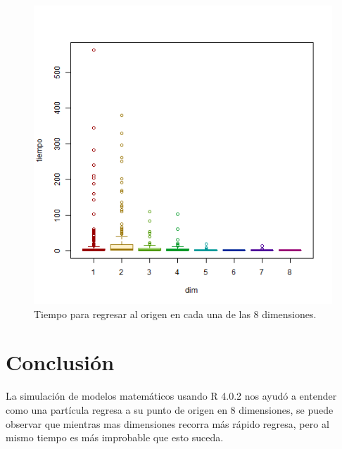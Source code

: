 \documentclass{article}
\begin{document}
\begin{figure}

 \begin{center}
\includegraphics[scale=0.3]{demo.png}
\end{center}
  \caption{Tiempo para regresar al origen en cada una de las 8 dimensiones.}
  \label{f1}
 
\end{figure}
 
\newpage

\section{Conclusi\'on}

La simulaci\'on de modelos matem\'aticos usando R 4.0.2 nos ayud\'o a entender como una part\'icula regresa a su punto de origen en 8 dimensiones, se puede observar que mientras mas dimensiones recorra m\'as r\'apido regresa, pero al mismo tiempo es m\'as improbable que esto suceda. 



\end{document}
